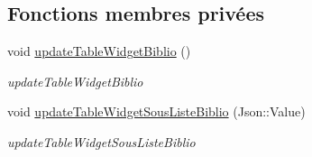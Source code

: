\subsection*{Fonctions membres privées}
\begin{DoxyCompactItemize}
\item 
\mbox{\label{classMainWindow_a3d2244f7cd6754e296d550a8774db184}} 
void \hyperlink{classMainWindow_a3d2244f7cd6754e296d550a8774db184}{update\+Table\+Widget\+Biblio} ()
\begin{DoxyCompactList}\small\item\em update\+Table\+Widget\+Biblio \end{DoxyCompactList}\item 
\mbox{\label{classMainWindow_a2c69407063bbc24fae04879a40fd762d}} 
void \hyperlink{classMainWindow_a2c69407063bbc24fae04879a40fd762d}{update\+Table\+Widget\+Sous\+Liste\+Biblio} (Json\+::\+Value)
\begin{DoxyCompactList}\small\item\em update\+Table\+Widget\+Sous\+Liste\+Biblio \end{DoxyCompactList}\end{DoxyCompactItemize}
